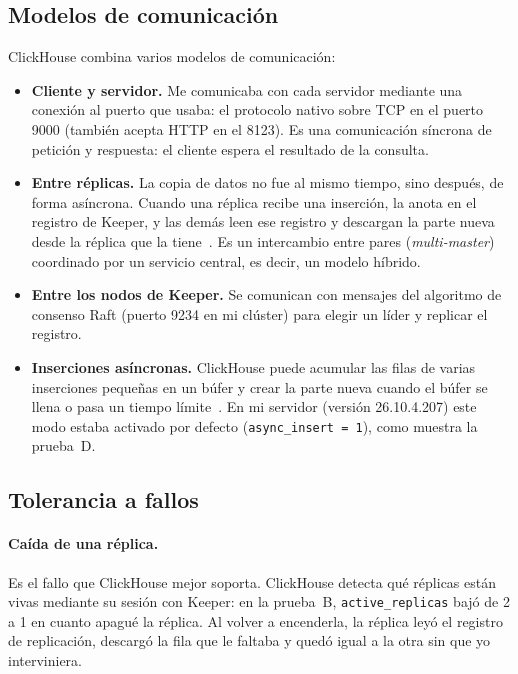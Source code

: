 \documentclass[12pt,a4paper]{article}
\begin{document}
\subsection{Modelos de comunicación}

ClickHouse combina varios modelos de comunicación:

\begin{itemize}
  \item \textbf{Cliente y servidor.} Me comunicaba con cada servidor
    mediante una conexión al puerto que usaba: el protocolo nativo sobre
    TCP en el puerto 9000 (también acepta HTTP en el 8123). Es una
    comunicación síncrona de petición y respuesta: el cliente espera el
    resultado de la consulta.
  \item \textbf{Entre réplicas.} La copia de datos no fue al mismo tiempo,
    sino después, de forma asíncrona. Cuando una réplica recibe una
    inserción, la anota en el registro de Keeper, y las demás leen ese
    registro y descargan la parte nueva desde la réplica que la
    tiene~\cite[p.~3736]{schulze2024}. Es un intercambio entre pares
    (\emph{multi-master}) coordinado por un servicio central, es decir,
    un modelo híbrido.
  \item \textbf{Entre los nodos de Keeper.} Se comunican con mensajes del
    algoritmo de consenso Raft (puerto 9234 en mi clúster) para elegir un
    líder y replicar el registro.
  \item \textbf{Inserciones asíncronas.} ClickHouse puede acumular las
    filas de varias inserciones pequeñas en un búfer y crear la parte
    nueva cuando el búfer se llena o pasa un tiempo
    límite~\cite[p.~3733]{schulze2024}. En mi servidor (versión
    26.10.4.207) este modo estaba activado por defecto
    (\texttt{async\_insert = 1}), como muestra la prueba~D.
\end{itemize}

\subsection{Tolerancia a fallos}

\paragraph{Caída de una réplica.} Es el fallo que ClickHouse mejor
soporta. ClickHouse detecta qué réplicas están vivas mediante su sesión
con Keeper: en la prueba~B, \texttt{active\_replicas} bajó de 2 a 1 en
cuanto apagué la réplica. Al volver a encenderla, la réplica leyó el
registro de replicación, descargó la fila que le faltaba y quedó igual a
la otra sin que yo interviniera.
\end{document}

